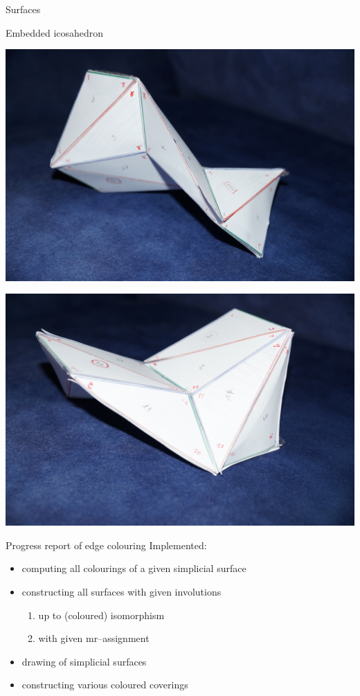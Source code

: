 \documentclass[11pt, handout]{beamer}
\begin{document}
\begin{frame}{Surfaces }
\begin{frame}{Embedded icosahedron}
    \begin{minipage}{0.45\textwidth}
        \includegraphics[width=\textwidth]{DSC09508.JPG}
    \end{minipage}
    \begin{minipage}{0.45\textwidth}
        \includegraphics[width=\textwidth]{DSC09510.JPG}
    \end{minipage}
\end{frame}
            

\begin{frame}{Progress report of edge colouring}
    \pause
    Implemented:
    \begin{itemize}
        \pause
        \item computing all colourings of a given simplicial surface
        \pause
        \item constructing all surfaces with given involutions
            \begin{enumerate}
                \pause
                \item up to (coloured) isomorphism
                \pause
                \item with given mr--assignment
            \end{enumerate}
        \pause
        \item drawing of simplicial surfaces
        \pause
        \item constructing various coloured coverings
    \end{itemize}


\end{frame}
\end{frame}
\end{document}

